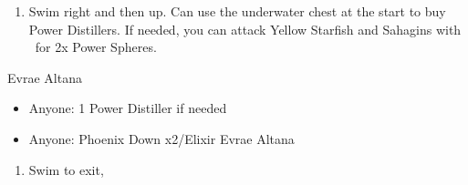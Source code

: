 \begin{enumerate}[resume]
  \item Swim right and then up. Can use the underwater chest at the start to buy Power Distillers. If needed, you can attack Yellow Starfish and Sahagins with \tidus\ for 2x Power Spheres.
\end{enumerate}
\begin{battle}{Evrae Altana}
  \begin{itemize}
    \item Anyone: 1 Power Distiller if needed
    \item Anyone: Phoenix Down x2/Elixir Evrae Altana
  \end{itemize}
\end{battle}
\begin{enumerate}[resume]
  \item Swim to exit, \sd
\end{enumerate}